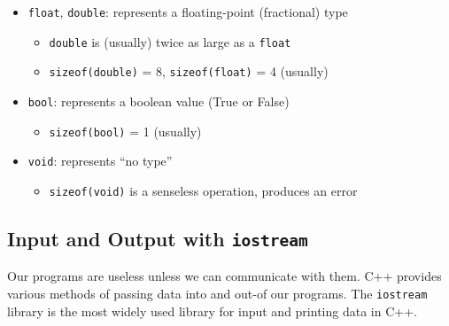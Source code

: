\documentclass{article}
\begin{document}
\begin{itemize}
\begin{itemize}
		\end{itemize}
		\item \texttt{float}, \texttt{double}: represents a floating-point (fractional) type
		\begin{itemize}
			\item \texttt{double} is (usually) twice as large as a \texttt{float}
			\item \texttt{sizeof(double)} = 8, \texttt{sizeof(float)} = 4 (usually)
		\end{itemize}
		\item \texttt{bool}: represents a boolean value (True or False)
		\begin{itemize}
			\item \texttt{sizeof(bool)} = 1 (usually)
		\end{itemize}
		\item \texttt{void}: represents ``no type''
		\begin{itemize}
			\item \texttt{sizeof(void)} is a senseless operation, produces an error
	\end{itemize}
\end{itemize}

\subsection{Input and Output with \texttt{iostream}}

\noindent
Our programs are useless unless we can communicate with them. C++ provides various methods of passing data into and out-of our programs. The \texttt{iostream} library is the most widely used library for input and printing data in C++.
\end{document}
